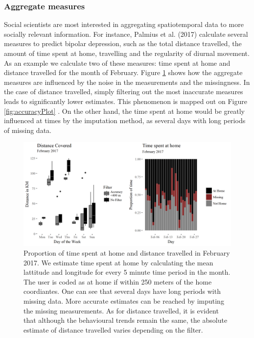 \documentclass[english,man]{apa6}
\theoremstyle{definition}
\theoremstyle{definition}
\theoremstyle{definition}
\theoremstyle{remark}
\begin{document}
\subsubsection{Aggregate measures}\label{aggregate-measures}

Social scientists are most interested in aggregating spatiotemporal data
to more socially relevant information. For instance, Palmius et al.
(2017) calculate several measures to predict bipolar depression, such as
the total distance travelled, the amount of time spent at home,
travelling and the regularity of diurnal movement. As an example we
calculate two of these measures: time spent at home and distance
travelled for the month of February. Figure \ref{fig:aggrePlot} shows
how the aggregate measures are influenced by the noise in the
measurements and the missingness. In the case of distance travelled,
simply filtering out the most inaccurate measures leads to significantly
lower estimates. This phenomenon is mapped out on Figure
\ref{fig:accuracyPlot} . On the other hand, the time spent at home would
be greatly influenced at times by the imputation method, as several days
with long periods of missing data.

\begin{figure}
\includegraphics[width=1\linewidth]{img/aggPlot} \caption{Proportion of time spent at home  and distance travelled in February 2017. We estimate time spent at home by calculating the mean lattitude and longitude for every 5 minute time period in the month. The user is coded as at home if within 250 meters of the home coordiantes. One can see that several days have long periods with missing data. More accurate estimates can be reached by imputing the missing measurements. As for distance travelled, it is evident that although the behavioural trends remain the same, the absolute estimate of distance travelled varies depending on the filter.}\label{fig:aggrePlot}
\end{figure}
\end{document}
